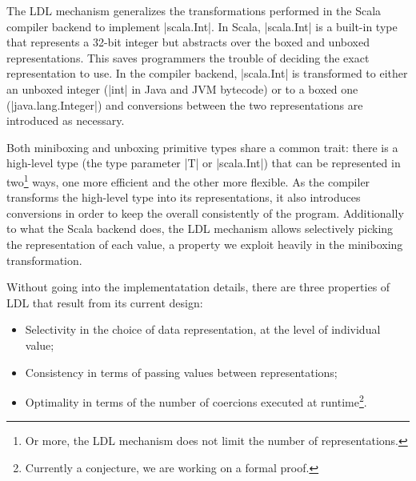The LDL mechanism generalizes the transformations performed in the Scala compiler backend to implement |scala.Int|. In Scala, |scala.Int| is a built-in type that represents a 32-bit integer but abstracts over the boxed and unboxed representations. This saves programmers the trouble of deciding the exact representation to use. In the compiler backend, |scala.Int| is transformed to either an unboxed integer (|int| in Java and JVM bytecode) or to a boxed one (|java.lang.Integer|) and conversions between the two representations are introduced as necessary. %


Both miniboxing and unboxing primitive types share a common trait: there is a high-level type (the type parameter |T| or |scala.Int|) that can be represented in two\footnote{Or more, the LDL mechanism does not limit the number of representations.} ways, one more efficient and the other more flexible. As the compiler transforms the high-level type into its representations, it also introduces conversions in order to keep the overall consistently of the program. Additionally to what the Scala backend does, the LDL mechanism allows selectively picking the representation of each value, a property we exploit heavily in the miniboxing transformation.

Without going into the implementatation details, there are three properties of LDL that result from its current design:

\begin{itemize}
  \item Selectivity in the choice of data representation, at the level of individual value;
  \item Consistency in terms of passing values between representations; %
  \item Optimality in terms of the number of coercions executed at runtime\footnote{Currently a conjecture, we are working on a formal proof.}.
\end{itemize}

